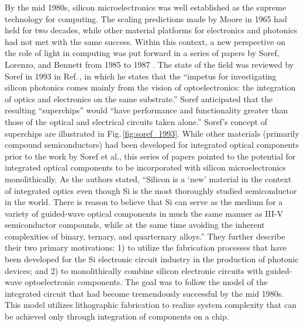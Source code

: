 By the mid 1980s, silicon microelectronics was well established as the supreme technology for computing. The scaling predictions made by Moore in 1965 \cite{mo1965} had held for two decades, while other material platforms for electronics and photonics had not met with the same success. Within this context, a new perspective on the role of light in computing was put forward in a series of papers by Soref, Lorenzo, and Bennett from 1985 to 1987 \cite{sole1985,sole1986,sobe1987}. The state of the field was reviewed by Soref in 1993 in Ref.\,\cite{so1993}, in which he states that the ``impetus for investigating silicon photonics comes mainly from the vision of optoelectronics: the integration of optics and electronics on the same substrate.'' Soref anticipated that the resulting ``superchips'' would ``have performance and functionality greater than those of the optical and electrical circuits taken alone.'' Soref's concept of superchips are illustrated in Fig.\,\ref{fig:soref_1993}. While other materials (primarily compound semiconductors) had been developed for integrated optical components prior to the work by Soref et al., this series of papers pointed to the potential for integrated optical components to be incorporated with silicon microelectronics monolithically. As the authors stated, ``Silicon is a `new' material in the context of integrated optics even though Si is the most thoroughly studied semiconductor in the world. There is reason to believe that Si can serve as the medium for a variety of guided-wave optical components in much the same manner as III-V semiconductor compounds, while at the same time avoiding the inherent complexities of binary, ternary, and quarternary alloys.'' \cite{sole1986} They further describe their two primary motivations: 1) to utilize the fabrication processes that have been developed for the Si electronic circuit industry in the production of photonic devices; and 2) to monolithically combine silicon electronic circuits with guided-wave optoelectronic components. The goal was to follow the model of the integrated circuit that had become tremendously successful by the mid 1980s. This model utilizes lithographic fabrication to realize system complexity that can be achieved only through integration of components on a chip.

